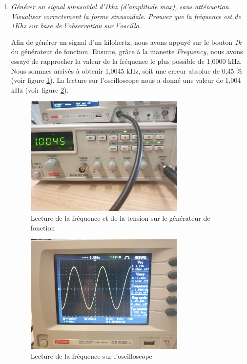 \documentclass[a4paper]{article}
\begin{document}
\begin{enumerate}





\item \textit{Générer un signal sinusoïdal d'1khz (d'amplitude max), sans atténuation. Visualiser correctement la forme sinusoïdale. Prouver que la fréquence est de 1Khz sur base de l'observation sur l'oscillo.}

  Afin de générer un signal d'un kilohertz, nous avons appuyé sur le bouton \textit{1k} du générateur de fonction. Ensuite, grâce à la manette \textit{Frequency}, nous avons essayé de rapprocher la valeur de la fréquence le plus possible de 1,0000 kHz. Nous sommes arrivés à obtenir 1,0045 kHz, soit une erreur absolue de 0,45 \% (voir figure \ref{fig:UnKhz02}). La lecture sur l'oscilloscope nous a donné une valeur de 1,004 kHz (voir figure \ref{fig:UnKhz03}).

\begin{figure}%
    \centering
    \includegraphics[width=0.75\textwidth]{UnKhz02.jpg}
    \caption{Lecture de la fréquence et de la tension sur le générateur de fonction}
    \label{fig:UnKhz02}
\end{figure}

\begin{figure}%
    \centering
    \includegraphics[width=0.75\textwidth]{UnKhz03.jpg}
    \caption{Lecture de la fréquence sur l'oscilloscope}
    \label{fig:UnKhz03}
\end{figure}






\end{enumerate}
\end{document}
